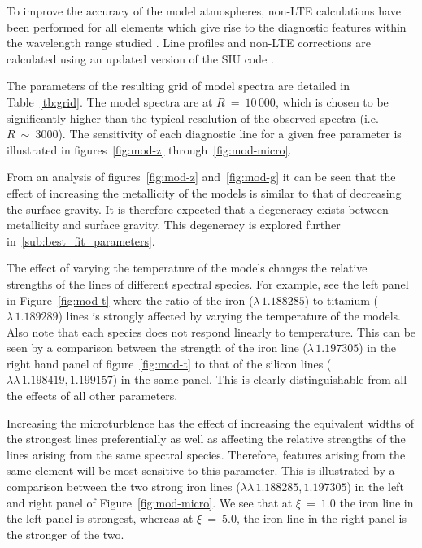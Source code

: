 To improve the accuracy of the model atmospheres,
non-LTE calculations have been performed for all elements which give rise to the diagnostic features within the wavelength range studied
\citep{2012ApJ...751..156B,2013ApJ...764..115B,2014arXiv1412.6527B}.
Line profiles and non-LTE corrections are calculated using an updated version of the SIU code
\citep{1999PhDT.........3R,2012ApJ...751..156B}.

The parameters of the resulting grid of model spectra are detailed in
Table~\ref{tb:grid}.
The model spectra are at $R~=~10\,000$,
which is chosen to be significantly higher than the typical resolution of the observed spectra
(i.e. $R~\sim~3000$).
The sensitivity of each diagnostic line for a given free parameter is illustrated in figures~\ref{fig:mod-z} through~\ref{fig:mod-micro}.

From an analysis of figures~\ref{fig:mod-z} and~\ref{fig:mod-g} it can be seen that the effect of increasing the metallicity of the models is similar to that of decreasing the surface gravity.
It is therefore expected that a degeneracy exists between metallicity and surface gravity.
This degeneracy is explored further in~\ref{sub:best_fit_parameters}.

The effect of varying the temperature of the models changes the relative strengths of the lines of different spectral species.
For example, see the left panel in Figure~\ref{fig:mod-t} where the ratio of the iron
($\lambda\,1.188285$) to titanium ($\lambda\,1.189289$) lines is strongly affected by varying the temperature of the models.
Also note that each species does not respond linearly to temperature.
This can be seen by a comparison between the strength of the iron line
($\lambda\,1.197305$) in the right hand panel of figure~\ref{fig:mod-t} to that of the silicon lines
($\lambda\lambda\,1.198419, 1.199157$) in the same panel.
This is clearly distinguishable from all the effects of all other parameters.


Increasing the microturblence has the effect of increasing the equivalent widths
of the strongest lines preferentially as well as affecting the relative strengths of the lines arising from the same spectral species.
Therefore, features arising from the same element will be most sensitive to this
parameter.
This is illustrated by a comparison between the two strong iron lines
($\lambda\lambda\,1.188285, 1.197305$) in the left and
right panel of Figure~\ref{fig:mod-micro}.
We see that at $\xi~=~1.0$ the iron line in the left panel is strongest,
whereas at $\xi~=~5.0$, the iron line in the right panel is the stronger of the two.



